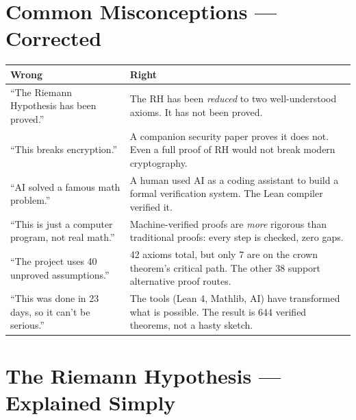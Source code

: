 \documentclass[11pt,a4paper]{article}
\begin{document}
\section{Common Misconceptions --- Corrected}

\begin{center}
\small
\begin{tabular}{@{}p{6cm}p{6.5cm}@{}}
\toprule
\textcolor{wrong}{\textbf{Wrong}} &
\textcolor{correct}{\textbf{Right}} \\
\midrule
``The Riemann Hypothesis has been proved.'' &
The RH has been \emph{reduced} to two well-understood
axioms. It has not been proved. \\[6pt]

``This breaks encryption.'' &
A companion security paper proves it does not. Even
a full proof of RH would not break modern cryptography. \\[6pt]

``AI solved a famous math problem.'' &
A human used AI as a coding assistant to build a formal
verification system. The Lean compiler verified it. \\[6pt]

``This is just a computer program, not real math.'' &
Machine-verified proofs are \emph{more} rigorous than
traditional proofs: every step is checked, zero gaps. \\[6pt]

``The project uses 40 unproved assumptions.'' &
42 axioms total, but only 7 are on the crown theorem's
critical path. The other 38 support alternative proof
routes. \\[6pt]

``This was done in 23 days, so it can't be serious.'' &
The tools (Lean 4, Mathlib, AI) have transformed what
is possible. The result is 644 verified theorems, not
a hasty sketch.  \\
\bottomrule
\end{tabular}
\end{center}

\section{The Riemann Hypothesis --- Explained Simply}
\end{document}
